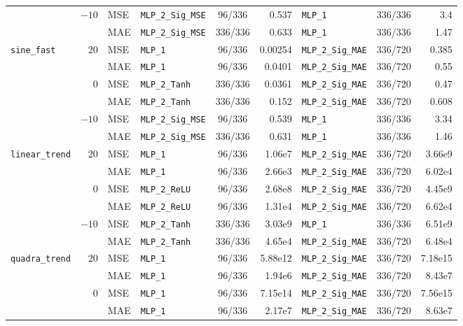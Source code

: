 \documentclass[12pt]{article}
\theoremstyle{definition}
\begin{document}
{\begin{enumerate}[label=\textbf{1.2.\arabic*}, leftmargin=*]
{\begin{longtable}{@{}lrl@{\hspace{8pt}}lcr@{\hspace{8pt}}lcr@{}}
\addlinespace[2pt]
 & $-10$ & MSE & \texttt{MLP\_2\_Sig\_MSE} & 96/336 & 0.537 & \texttt{MLP\_1} & 336/336 & 3.4 \\
 &  & MAE & \texttt{MLP\_2\_Sig\_MSE} & 336/336 & 0.633 & \texttt{MLP\_1} & 336/336 & 1.47 \\
\midrule
\texttt{sine\_fast} & $20$ & MSE & \texttt{MLP\_1} & 96/336 & 0.00254 & \texttt{MLP\_2\_Sig\_MAE} & 336/720 & 0.385 \\
 &  & MAE & \texttt{MLP\_1} & 96/336 & 0.0401 & \texttt{MLP\_2\_Sig\_MAE} & 336/720 & 0.55 \\
\addlinespace[2pt]
 & $0$ & MSE & \texttt{MLP\_2\_Tanh} & 336/336 & 0.0361 & \texttt{MLP\_2\_Sig\_MAE} & 336/720 & 0.47 \\
 &  & MAE & \texttt{MLP\_2\_Tanh} & 336/336 & 0.152 & \texttt{MLP\_2\_Sig\_MAE} & 336/720 & 0.608 \\
\addlinespace[2pt]
 & $-10$ & MSE & \texttt{MLP\_2\_Sig\_MSE} & 96/336 & 0.539 & \texttt{MLP\_1} & 336/336 & 3.34 \\
 &  & MAE & \texttt{MLP\_2\_Sig\_MSE} & 336/336 & 0.631 & \texttt{MLP\_1} & 336/336 & 1.46 \\
\midrule
\texttt{linear\_trend} & $20$ & MSE & \texttt{MLP\_1} & 96/336 & 1.06e7 & \texttt{MLP\_2\_Sig\_MAE} & 336/720 & 3.66e9 \\
 &  & MAE & \texttt{MLP\_1} & 96/336 & 2.66e3 & \texttt{MLP\_2\_Sig\_MAE} & 336/720 & 6.02e4 \\
\addlinespace[2pt]
 & $0$ & MSE & \texttt{MLP\_2\_ReLU} & 96/336 & 2.68e8 & \texttt{MLP\_2\_Sig\_MAE} & 336/720 & 4.45e9 \\
 &  & MAE & \texttt{MLP\_2\_ReLU} & 96/336 & 1.31e4 & \texttt{MLP\_2\_Sig\_MAE} & 336/720 & 6.62e4 \\
\addlinespace[2pt]
 & $-10$ & MSE & \texttt{MLP\_2\_Tanh} & 336/336 & 3.03e9 & \texttt{MLP\_1} & 336/336 & 6.51e9 \\
 &  & MAE & \texttt{MLP\_2\_Tanh} & 336/336 & 4.65e4 & \texttt{MLP\_2\_Sig\_MAE} & 336/720 & 6.48e4 \\
\midrule
\texttt{quadra\_trend} & $20$ & MSE & \texttt{MLP\_1} & 96/336 & 5.88e12 & \texttt{MLP\_2\_Sig\_MAE} & 336/720 & 7.18e15 \\
 &  & MAE & \texttt{MLP\_1} & 96/336 & 1.94e6 & \texttt{MLP\_2\_Sig\_MAE} & 336/720 & 8.43e7 \\
\addlinespace[2pt]
 & $0$ & MSE & \texttt{MLP\_1} & 96/336 & 7.15e14 & \texttt{MLP\_2\_Sig\_MAE} & 336/720 & 7.56e15 \\
 &  & MAE & \texttt{MLP\_1} & 96/336 & 2.17e7 & \texttt{MLP\_2\_Sig\_MAE} & 336/720 & 8.63e7 \\

\end{longtable}}
\end{enumerate}}
\end{document}
